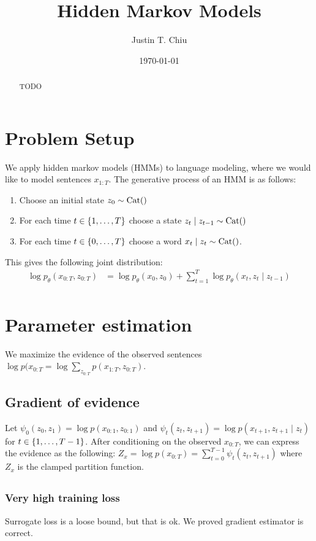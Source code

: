 \documentclass[12pt]{article}
\title{Hidden Markov Models}
\author{
Justin T. Chiu
}
\date{\today}
\begin{document}
\maketitle

\begin{abstract}
TODO
\end{abstract}

\section{Problem Setup}
We apply hidden markov models (HMMs) to language modeling,
where we would like to model sentences $x_{1:T}$.
The generative process of an HMM is as follows:
\begin{enumerate}
\item Choose an initial state $z_0 \sim \mathrm{Cat}()$
\item For each time $t \in \left\{1, \ldots, T\right\}$ choose a state
$z_t \mid z_{t-1} \sim \mathrm{Cat}()$
\item For each time $t \in \left\{0, \ldots, T\right\}$ choose a word
$x_t \mid z_t \sim \mathrm{Cat}()$.
\end{enumerate}

This gives the following joint distribution:
\begin{align*}
\log p_\theta(x_{0:T}, z_{0:T}) &= \log p_\theta(x_0, z_0) + \sum_{t=1}^T \log p_\theta(x_t, z_t \mid z_{t-1})\\
\end{align*}

\section{Parameter estimation}
We maximize the evidence of the observed sentences $\log p(x_{0:T} = \log \sum_{z_{0:T}} p(x_{1:T}, z_{0:T})$.

\subsection{Gradient of evidence}
Let $\psi_0(z_0, z_1) = \log p(x_{0:1}, z_{0:1})$ and $\psi_t(z_{t}, z_{t+1}) = \log p(x_{t+1}, z_{t+1} \mid z_{t})$ for $t \in \left\{1, \ldots, T-1\right\}$.
After conditioning on the observed $x_{0:T}$, we can express the evidence as the following:
$Z_x = \log p(x_{0:T}) = \sum_{t=0}^{T-1} \psi_t(z_t, z_{t+1})$
where $Z_x$ is the clamped partition function.

\subsection{}


\subsubsection{Very high training loss}
Surrogate loss is a loose bound, but that is ok.
We proved gradient estimator is correct.

%
%
\end{document}
